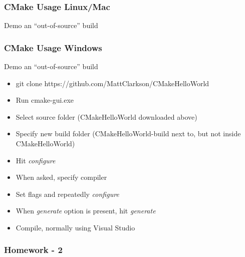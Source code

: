 \subsubsection{CMake Usage Linux/Mac}\label{cmake-usage-linuxmac}

Demo an ``out-of-source'' build

\begin{Shaded}
\begin{Highlighting}[]
 
 
 
 
 
\end{Highlighting}
\end{Shaded}

\subsubsection{CMake Usage Windows}\label{cmake-usage-windows}

Demo an ``out-of-source'' build

\begin{itemize}
\itemsep1pt\parskip0pt
\item
  git clone https://github.com/MattClarkson/CMakeHelloWorld
\item
  Run cmake-gui.exe
\item
  Select source folder (CMakeHelloWorld downloaded above)
\item
  Specify new build folder (CMakeHelloWorld-build next to, but not
  inside CMakeHelloWorld)
\item
  Hit \emph{configure}
\item
  When asked, specify compiler
\item
  Set flags and repeatedly \emph{configure}
\item
  When \emph{generate} option is present, hit \emph{generate}
\item
  Compile, normally using Visual Studio
\end{itemize}

\subsubsection{Homework - 2}\label{homework---2}

